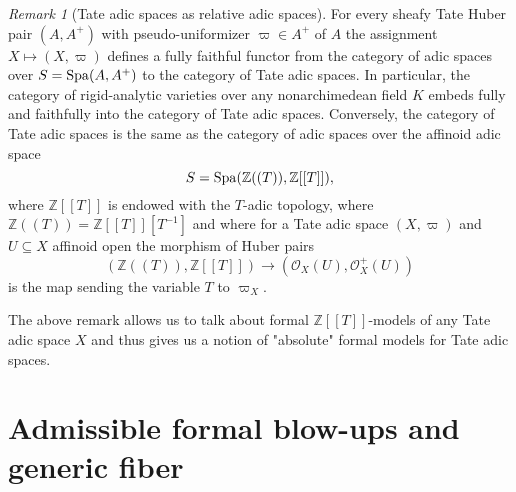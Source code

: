 \documentclass[12pt,twoside,a4paper]{article}
\theoremstyle{definition}
\theoremstyle{remark}
\newtheorem{rmk}[thm]{Remark}
\newcommand\Spa{{\rm Spa}}
\begin{document}
\begin{rmk}[Tate adic spaces as relative adic spaces]\label{Tate adic spaces as relative adic spaces}For every sheafy Tate Huber pair $(A, A^{+})$ with pseudo-uniformizer $\varpi\in A^{+}$ of $A$ the assignment $X\mapsto (X, \varpi)$ defines a fully faithful functor from the category of adic spaces over $S=\Spa(A, A^{+})$ to the category of Tate adic spaces. In particular, the category of rigid-analytic varieties over any nonarchimedean field $K$ embeds fully and faithfully into the category of Tate adic spaces. Conversely, the category of Tate adic spaces is the same as the category of adic spaces over the affinoid adic space\begin{equation*}S=\Spa(\mathbb{Z}((T)), \mathbb{Z}[[T]]),\end{equation*}where $\mathbb{Z}[[T]]$ is endowed with the $T$-adic topology, where $\mathbb{Z}((T))=\mathbb{Z}[[T]][T^{-1}]$ and where for a Tate adic space $(X, \varpi)$ and $U\subseteq X$ affinoid open the morphism of Huber pairs\begin{equation*}(\mathbb{Z}((T)), \mathbb{Z}[[T]])\to (\mathcal{O}_{X}(U), \mathcal{O}_{X}^{+}(U))\end{equation*}is the map sending the variable $T$ to $\varpi_{X}$.\end{rmk}
The above remark allows us to talk about formal $\mathbb{Z}[[T]]$-models of any Tate adic space $X$ and thus gives us a notion of "absolute" formal models for Tate adic spaces.

\section{Admissible formal blow-ups and generic fiber}\label{sec:formal blow-ups}
\end{document}
